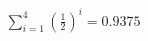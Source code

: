 \documentclass[preview]{standalone}
\begin{document}
\begin{align*}
\sum_{i=1}^{4} (\frac{1}{2})^i = {0.9375}
\end{align*}
\end{document}
